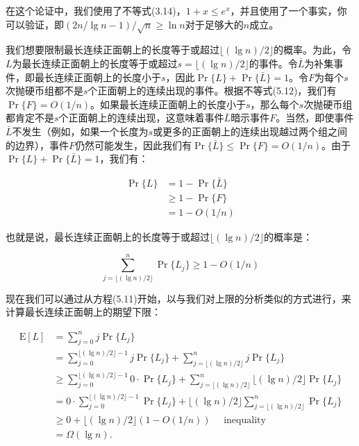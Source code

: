 \documentclass[lang=cn,newtx,10pt,scheme=chinese]{elegantbook}
\begin{document}
在这个论证中，我们使用了不等式(3.14)，$1+x \leq e^x$，并且使用了一个事实，你可以验证，即$(2n/\lg n-1)/\sqrt{n}\geq \ln n$对于足够大的$n$成立。

我们想要限制最长连续正面朝上的长度等于或超过$\lfloor(\lg n) / 2\rfloor$的概率。为此，令$L$为最长连续正面朝上的长度等于或超过$s=\lfloor(\lg n) / 2\rfloor$的事件。令$\bar{L}$为补集事件，即最长连续正面朝上的长度小于$s$，因此$\operatorname{Pr}\{L\}+\operatorname{Pr}\{\bar{L}\}=1$。令$F$为每个$s$次抛硬币组都不是$s$个正面朝上的连续出现的事件。根据不等式(5.12)，我们有$\operatorname{Pr}\{F\}=O(1/n)$。如果最长连续正面朝上的长度小于$s$，那么每个$s$次抛硬币组都肯定不是$s$个正面朝上的连续出现，这意味着事件$\bar{L}$暗示事件$F$。当然，即使事件$\bar{L}$不发生（例如，如果一个长度为$s$或更多的正面朝上的连续出现越过两个组之间的边界），事件$F$仍然可能发生，因此我们有$\operatorname{Pr}\{\bar{L}\}\leq \operatorname{Pr}\{F\}=O(1/n)$。由于$\operatorname{Pr}\{L\}+\operatorname{Pr}\{\bar{L}\}=1$，我们有：

$$
\begin{aligned}
\operatorname{Pr}\{L\} & =1-\operatorname{Pr}\{\bar{L}\} \\
& \geq 1-\operatorname{Pr}\{F\} \\
& =1-O(1 / n)
\end{aligned}
$$

也就是说，最长连续正面朝上的长度等于或超过$\lfloor(\lg n) / 2\rfloor$的概率是：

$$
\sum_{j=\lfloor(\lg n) / 2\rfloor}^n \operatorname{Pr}\{L_j\} \geq 1-O(1 / n)
$$

现在我们可以通过从方程(5.11)开始，以与我们对上限的分析类似的方式进行，来计算最长连续正面朝上的期望下限：

$$
\begin{aligned}
\mathrm{E}[L] & =\sum_{j=0}^n j \operatorname{Pr}\{L_j\} \\
& =\sum_{j=0}^{\lfloor(\lg n) / 2\rfloor-1} j \operatorname{Pr}\{L_j\}+\sum_{j=\lfloor(\lg n) / 2\rfloor}^n j \operatorname{Pr}\{L_j\} \\
& \geq \sum_{j=0}^{\lfloor(\lg n) / 2\rfloor-1} 0 \cdot \operatorname{Pr}\{L_j\}+\sum_{j=\lfloor(\lg n) / 2\rfloor}^n\lfloor(\lg n) / 2\rfloor \operatorname{Pr}\{L_j\} \\
& =0 \cdot \sum_{j=0}^{\lfloor(\lg n) / 2\rfloor-1} \operatorname{Pr}\{L_j\}+\lfloor(\lg n) / 2\rfloor \sum_{j=\lfloor(\lg n) / 2\rfloor}^n \operatorname{Pr}\{L_j\} \\
& \geq 0+\lfloor(\lg n) / 2\rfloor(1-O(1 / n)) \quad \text { inequality } \\
& =\Omega(\lg n) .
\end{aligned}
$$
\end{document}
